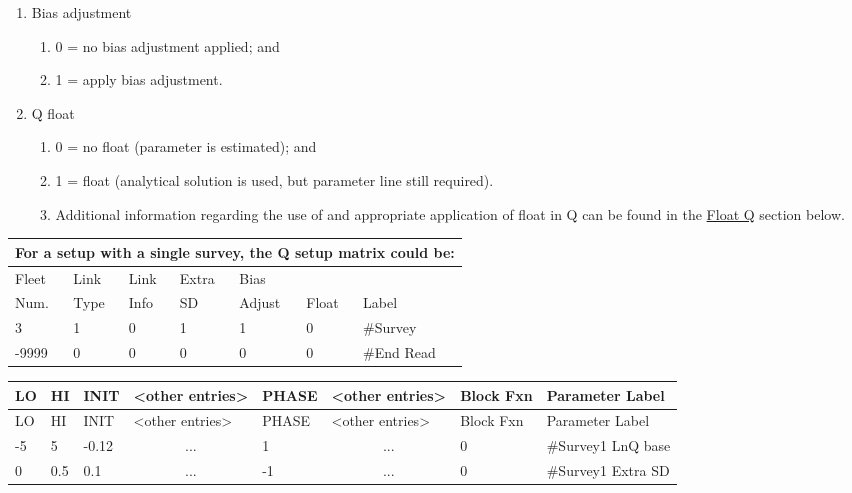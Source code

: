 \begin{enumerate}
\begin{enumerate}
	\end{enumerate}
	\item Bias adjustment
	\begin{enumerate}
		\item 0 = no bias adjustment applied; and
		\item 1 = apply bias adjustment.
	\end{enumerate}
	\item Q float
	\begin{enumerate}
		\item 0 = no float (parameter is estimated); and
		\item 1 = float (analytical solution is used, but parameter line still required).
		\item Additional information regarding the use of and appropriate application of float in Q can be found in the \hyperlink{FloatQ}{Float Q} section below.
	\end{enumerate}
\end{enumerate}


\begin{longtable}{p{2cm} p{2cm} p{2cm} p{2cm} p{2cm} p{1.3cm} p{2.3cm}}
	\multicolumn{7}{l}{For a setup with a single survey, the Q setup matrix could be:}\\
	\hline
	Fleet \Tstrut & Link & Link & Extra  & Bias   &   & \\
	Num.          & Type & Info & SD     & Adjust & Float  & Label\Bstrut\\
	\hline
	3 & 1 & 0 & 1 & 1 & 0 & \#Survey  \Tstrut\\
	-9999 & 0 & 0 & 0 & 0 & 0 & \#End Read \Bstrut\\
	\hline
\end{longtable}


\begin{longtable}{p{1cm} p{1cm} p{1cm}  p{1.5cm}  p{1.5cm} p{1.5cm}  p{1.75cm}  p{4cm} }
	\hline
	LO \Tstrut & HI & INIT & <other entries> & PHASE & <other entries> & Block Fxn & Parameter Label\Bstrut\\
	\hline
	\endfirsthead

	\hline
	LO \Tstrut & HI & INIT & <other entries> & PHASE & <other entries> &Block Fxn & Parameter Label\Bstrut\\
	\hline
	\endhead

	\hline
	\endfoot
	\endlastfoot

	-5 & 5   & -0.12 & \multicolumn{1}{c}{...} & 1  & \multicolumn{1}{c}{...} & 0  & \#Survey1 LnQ base\Tstrut\\
	0  & 0.5 & 0.1   & \multicolumn{1}{c}{...} & -1 & \multicolumn{1}{c}{...} & 0  & \#Survey1 Extra SD\Bstrut\\
	\hline
\end{longtable}

